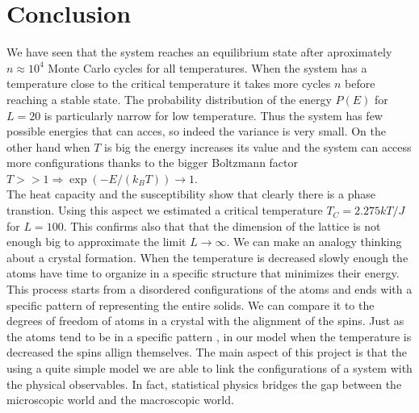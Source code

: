 \documentclass[%
preprint,
 amsmath,amssymb,
 aps,
]{revtex4-1}
\theoremstyle{plain}
\theoremstyle{definition}
\theoremstyle{plain}
\begin{document}
\section{Conclusion}
We have seen that the system reaches an equilibrium state after  aproximately $n \approx 10^4$ Monte Carlo cycles for all temperatures. When the system has a temperature close to the critical temperature it takes more cycles $n$ before reaching a stable state.
The probability distribution of the energy $P(E)$  for $L=20$ is particularly narrow for low temperature. Thus the system has few possible energies that can acces, so indeed the variance is very small. On the other hand when $T$ is big the energy increases its value and the system can access more configurations thanks to the bigger Boltzmann factor $T >> 1 \Rightarrow \exp(-E/(k_B T)) \to 1$. \\
The heat capacity and the susceptibility show that clearly there is a phase transtion. Using this aspect we estimated a critical temperature $T_C = 2.275 kT/J$ for $L=100$. This confirms also that that the dimension of the lattice is not enough big to approximate the limit $L \to \infty$.
We can make an analogy thinking about a crystal formation. When the temperature is decreased slowly enough the atoms have time to organize in a specific structure that minimizes their energy. This process starts from a disordered configurations of the atoms and ends with a specific pattern of representing the entire solids.  
We can compare it to the degrees of freedom of atoms in a crystal with the alignment of the spins. Just as the atoms tend to be in a specific pattern , in our model when the temperature is decreased the spins allign themselves.
The main aspect of this project is that the using a quite simple model we are able to link the configurations of a system with the physical observables. In fact, statistical physics bridges the gap between the microscopic world and the macroscopic world.




\end{document}
